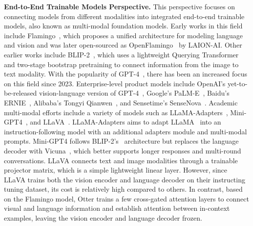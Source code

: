 \documentclass{article}
\begin{document}
\textbf{End-to-End Trainable Models Perspective.} This perspective focuses on connecting models from different modalities into integrated end-to-end trainable models, also known as multi-modal foundation models. Early works in this field include Flamingo~\cite{flamingo}, which proposes a unified architecture for modeling language and vision and was later open-sourced as OpenFlamingo~\cite{open_flamingo} by LAION-AI. Other earlier works include BLIP-2~\cite{li2023blip}, which uses a lightweight Querying Transformer and two-stage bootstrap pretraining to connect information from the image to text modality. With the popularity of GPT-4~\cite{gpt4}, there has been an increased focus on this field since 2023. Enterprise-level product models include OpenAI's yet-to-be-released vision-language version of GPT-4~\cite{gpt4}, Google's PaLM-E~\cite{driess2023palm}, Baidu's ERNIE~\cite{ernie_bot}, Alibaba's Tongyi Qianwen~\cite{tongyi}, and Sensetime's SenseNova~\cite{sensenova}. Academic multi-modal efforts include a variety of models such as LLaMA-Adapters~\cite{llama_adapater}, Mini-GPT4~\cite{mini_gpt4}, and LLaVA~\cite{llava}. LLaMA-Adapters aims to adapt LLaMA~\cite{llama} into an instruction-following model with an additional adapters module and multi-modal prompts. Mini-GPT4 follows BLIP-2's~\cite{li2023blip} architecture but replaces the language decoder with Vicuna~\cite{vicuna2023}, which better supports longer responses and multi-round conversations. LLaVA connects text and image modalities through a trainable projector matrix, which is a simple lightweight linear layer. However, since LLaVA trains both the vision encoder and language decoder on their instructing tuning dataset, its cost is relatively high compared to others. In contrast, based on the Flamingo model, Otter trains a few cross-gated attention layers to connect visual and language information and establish attention between in-context examples, leaving the vision encoder and language decoder frozen.
\end{document}
